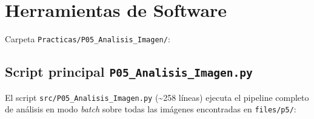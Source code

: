 \documentclass[12pt,a4paper]{article}
\begin{document}
\section{Herramientas de Software}
\label{sec:software}

Carpeta \texttt{Practicas/P05\_Analisis\_Imagen/}:

\subsection{Script principal \texttt{P05\_Analisis\_Imagen.py}}

El script \texttt{src/P05\_Analisis\_Imagen.py} (\textasciitilde258 líneas)
ejecuta el pipeline completo de análisis en modo \emph{batch} sobre todas
las imágenes encontradas en \texttt{files/p5/}:
\end{document}
